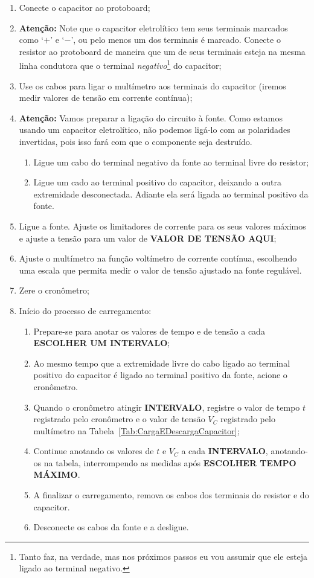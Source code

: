 \begin{enumerate}
    \item Conecte o capacitor ao protoboard;
	\item \textbf{Atenção:} Note que o capacitor eletrolítico tem seus terminais marcados como `$+$' e `$-$', ou pelo menos um dos terminais é marcado. Conecte o resistor ao protoboard de maneira que um de seus terminais esteja na mesma linha condutora que o terminal \emph{negativo}\footnote{Tanto faz, na verdade, mas nos próximos passos eu vou assumir que ele esteja ligado ao terminal negativo.} do capacitor;
	\item Use os cabos para ligar o multímetro aos terminais do capacitor (iremos medir valores de tensão em corrente contínua);
	\item \textbf{Atenção:} Vamos preparar a ligação do circuito à fonte. Como estamos usando um capacitor eletrolítico, não podemos ligá-lo com as polaridades invertidas, pois isso fará com que o componente seja destruído.
	    \begin{enumerate}
	        \item Ligue um cabo do terminal negativo da fonte ao terminal livre do resistor;
	        \item Ligue um cado ao terminal positivo do capacitor, deixando a outra extremidade desconectada. Adiante ela será ligada ao terminal positivo da fonte.
        \end{enumerate}
    \item Ligue a fonte. Ajuste os limitadores de corrente para os seus valores máximos e ajuste a tensão para um valor de \textbf{VALOR DE TENSÃO AQUI};
	\item Ajuste o multímetro na função voltímetro de corrente contínua, escolhendo uma escala que permita medir o valor de tensão ajustado na fonte regulável.
	\item Zere o cronômetro;
	\item Início do processo de carregamento:
	    \begin{enumerate}
	        \item Prepare-se para anotar os valores de tempo e de tensão a cada \textbf{ESCOLHER UM INTERVALO};
	        \item Ao mesmo tempo que a extremidade livre do cabo ligado ao terminal positivo do capacitor é ligado ao terminal positivo da fonte, acione o cronômetro.
	        \item Quando o cronômetro atingir \textbf{INTERVALO}, registre o valor de tempo $t$ registrado pelo cronômetro e o valor de tensão $V_C$ registrado pelo multímetro na Tabela~\ref{Tab:CargaEDescargaCapacitor};
	        \item Continue anotando os valores de $t$ e $V_C$ a cada \textbf{INTERVALO}, anotando-os na tabela, interrompendo as medidas após \textbf{ESCOLHER TEMPO MÁXIMO}.
	        \item A finalizar o carregamento, remova os cabos dos terminais do resistor e do capacitor.
	        \item Desconecte os cabos da fonte e a desligue.
        \end{enumerate}
\end{enumerate}

